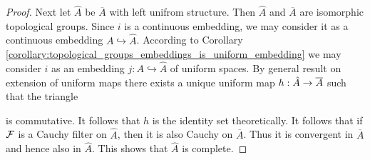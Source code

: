 \documentclass[10pt]{amsart}
\begin{document}
\begin{proof}
	Next let $\hat{A}$ be $\overline{A}$ with left unifrom structure. Then $\hat{A}$ and $\overline{A}$ are isomorphic topological groups. Since $i$ is a continuous embedding, we may consider it as a continuous embedding $A\hookrightarrow \hat{A}$. According to Corollary \ref{corollary:topological_groups_embeddings_is_uniform_embedding} we may consider $i$ as an embedding $j:A\hookrightarrow \hat{A}$ of uniform spaces. By general result on extension of uniform maps there exists a unique uniform map $h:\hat{A}\rightarrow \overline{A}$ such that the triangle
	\begin{center}
	\end{center}
	is commutative. It follows that $h$ is the identity set theoretically. It follows that if ${\mathcal F}$ is a Cauchy filter on $\hat{A}$, then it is also Cauchy on $\overline{A}$. Thus it is convergent in $\overline{A}$ and hence also in $\hat{A}$. This shows that $\hat{A}$ is complete.
\end{proof}






































\small


\end{document}
